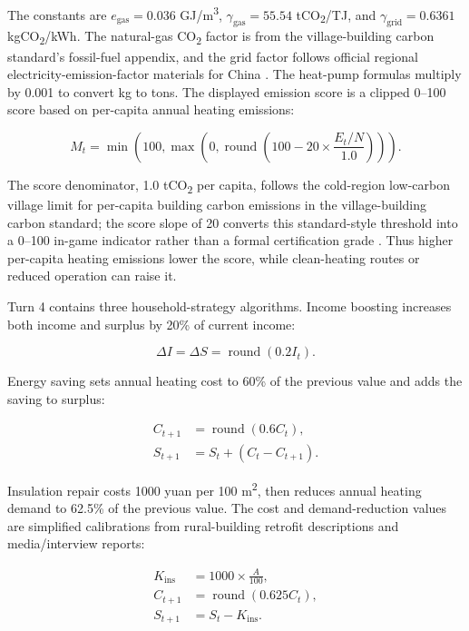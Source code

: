 \documentclass[stu,12pt,floatsintext,donotrepeattitle]{apa7}
\begin{document}
The constants are \(e_{\mathrm{gas}}=0.036\) GJ/m\textsuperscript{3}, \(\gamma_{\mathrm{gas}}=55.54\) tCO\textsubscript{2}/TJ, and \(\gamma_{\mathrm{grid}}=0.6361\) kgCO\textsubscript{2}/kWh. The natural-gas CO\textsubscript{2} factor is from the village-building carbon standard's fossil-fuel appendix, and the grid factor follows official regional electricity-emission-factor materials for China \cite{mee2020grid,cabr2025rural}. The heat-pump formulas multiply by 0.001 to convert kg to tons. The displayed emission score is a clipped 0--100 score based on per-capita annual heating emissions:

\begin{equation}
M_t = \min\left(100,\max\left(0,\operatorname{round}\left(100 - 20 \times \frac{E_t/N}{1.0}\right)\right)\right).
\end{equation}

The score denominator, 1.0 tCO\textsubscript{2} per capita, follows the cold-region low-carbon village limit for per-capita building carbon emissions in the village-building carbon standard; the score slope of 20 converts this standard-style threshold into a 0--100 in-game indicator rather than a formal certification grade \cite{cabr2025rural}. Thus higher per-capita heating emissions lower the score, while clean-heating routes or reduced operation can raise it.

Turn 4 contains three household-strategy algorithms. Income boosting increases both income and surplus by 20\% of current income:

\begin{equation}
\Delta I = \Delta S = \operatorname{round}(0.2 I_t).
\end{equation}

Energy saving sets annual heating cost to 60\% of the previous value and adds the saving to surplus:

\begin{align}
C_{t+1} &= \operatorname{round}(0.6 C_t), \\
S_{t+1} &= S_t + (C_t - C_{t+1}).
\end{align}

Insulation repair costs 1000 yuan per 100 m\textsuperscript{2}, then reduces annual heating demand to 62.5\% of the previous value. The cost and demand-reduction values are simplified calibrations from rural-building retrofit descriptions and media/interview reports:

\begin{align}
K_{\mathrm{ins}} &= 1000 \times \frac{A}{100}, \\
C_{t+1} &= \operatorname{round}(0.625 C_t), \\
S_{t+1} &= S_t - K_{\mathrm{ins}}.
\end{align}
\end{document}
